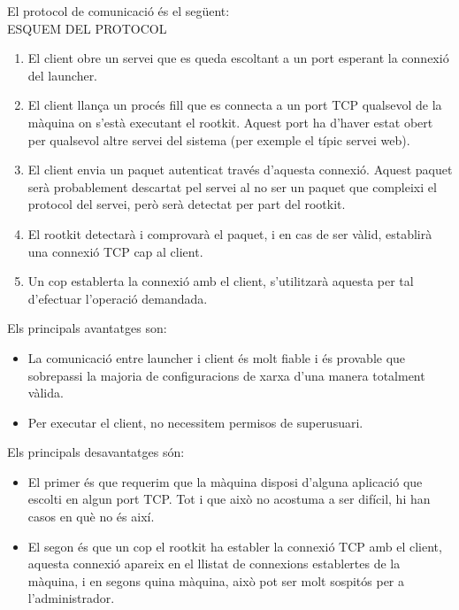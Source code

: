 El protocol de comunicació és el següent: \\

ESQUEM DEL PROTOCOL \\

\begin{enumerate}
    \item El client obre un servei que es queda escoltant a un port esperant la connexió del launcher.
    \item El client llança un procés fill que es connecta a un port TCP qualsevol de la màquina on s'està 
        executant el rootkit. Aquest port ha d'haver estat obert per qualsevol altre servei del sistema (per 
        exemple el típic servei web).
    \item El client envia un paquet autenticat través d'aquesta connexió. Aquest paquet serà probablement  
        descartat pel servei al no ser un paquet que compleixi el protocol del servei, però serà detectat per
        part del rootkit.
    \item El rootkit detectarà i comprovarà el paquet, i en cas de ser vàlid, establirà una connexió TCP cap 
        al client.
    \item Un cop establerta la connexió amb el client, s'utilitzarà aquesta per tal d'efectuar l'operació 
        demandada.
\end{enumerate}

Els principals avantatges son: \\

\begin{itemize}
    \item La comunicació entre launcher i client és molt fiable i és provable que sobrepassi la majoria de 
        configuracions de xarxa d'una manera totalment vàlida.
    \item Per executar el client, no necessitem permisos de superusuari.
\end{itemize}

Els principals desavantatges són: \\

\begin{itemize}
    \item El primer és que requerim que la màquina disposi d'alguna aplicació que escolti en algun port 
        TCP. Tot i que això no acostuma a ser difícil, hi han casos en què no és així.
    \item El segon és que un cop el rootkit ha establer la connexió TCP amb el client, aquesta connexió
        apareix en el llistat de connexions establertes de la màquina, i en segons quina màquina, això
        pot ser molt sospitós per a l'administrador.
\end{itemize}

